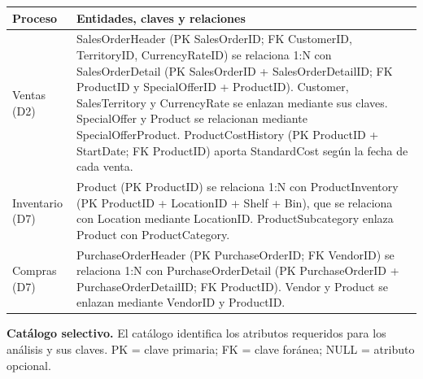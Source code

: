 \documentclass[10pt,a4paper]{article}
\begin{document}
\small
\begin{longtable}{p{}p{}}
\toprule
\textbf{Proceso} & \textbf{Entidades, claves y relaciones}\\
\midrule
\endhead
Ventas (D2) &
SalesOrderHeader (PK SalesOrderID; FK CustomerID, TerritoryID,
CurrencyRateID) se relaciona 1:N con SalesOrderDetail (PK SalesOrderID +
SalesOrderDetailID; FK ProductID y SpecialOfferID + ProductID).
Customer, SalesTerritory y CurrencyRate se enlazan mediante sus claves.
SpecialOffer y Product se relacionan mediante SpecialOfferProduct.
ProductCostHistory (PK ProductID + StartDate; FK ProductID) aporta StandardCost
según la fecha de cada venta.\\
Inventario (D7) &
Product (PK ProductID) se relaciona 1:N con ProductInventory (PK ProductID +
LocationID + Shelf + Bin), que se relaciona con Location mediante LocationID.
ProductSubcategory enlaza Product con ProductCategory.\\
Compras (D7) &
PurchaseOrderHeader (PK PurchaseOrderID; FK VendorID) se relaciona 1:N con
PurchaseOrderDetail (PK PurchaseOrderID + PurchaseOrderDetailID; FK ProductID).
Vendor y Product se enlazan mediante VendorID y ProductID.\\
\bottomrule
\end{longtable}
\normalsize

\textbf{Catálogo selectivo.} El catálogo identifica los atributos requeridos
para los análisis y sus claves. PK = clave primaria; FK = clave foránea;
NULL = atributo opcional.
\end{document}
